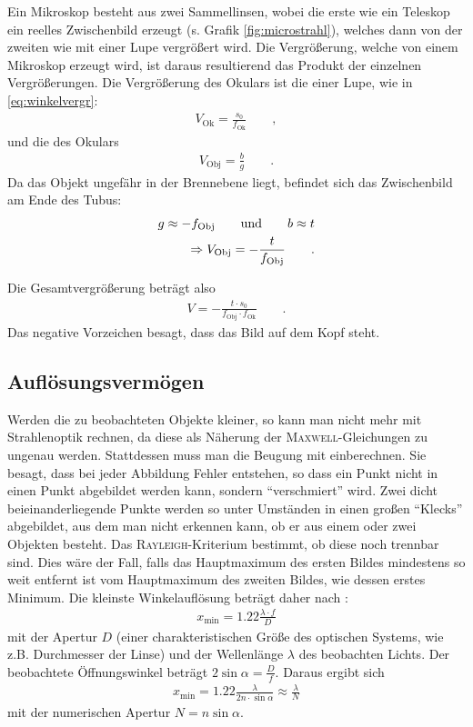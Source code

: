 \documentclass[12pt,a4paper,titlepage,headinclude,bibtotoc]{scrartcl}
\begin{document}
Ein Mikroskop besteht aus zwei Sammellinsen, wobei die erste wie ein Teleskop ein reelles Zwischenbild erzeugt (s. Grafik \ref{fig:microstrahl}), welches dann von der zweiten wie mit einer Lupe vergrößert wird.
Die Vergrößerung, welche von einem Mikroskop erzeugt wird, ist daraus resultierend das Produkt der einzelnen Vergrößerungen.
Die Vergrößerung des Okulars ist die einer Lupe, wie in \eqref{eq:winkelvergr}:
\begin{align}
V_\text{Ok}=\frac{s_0}{f_\text{Ok}}\qquad ,
\end{align}
und die des Okulars
\begin{align}
V_\text{Obj}=\frac{b}{g}\qquad .
\end{align}
Da das Objekt ungefähr in der Brennebene liegt, befindet sich das Zwischenbild am Ende des Tubus:
\begin{align}
\notag g\approx -f_\text{Obj} \qquad \text{und}\qquad b\approx t\\
\Rightarrow V_\text{Obj}=-\frac{t}{f_\text{Obj}}\qquad .
\end{align}

Die Gesamtvergrößerung beträgt also
\begin{align}
V=-\frac{t\cdot s_0}{f_\text{Obj}\cdot f_\text{Ok}}\qquad .
\end{align}
Das negative Vorzeichen besagt, dass das Bild auf dem Kopf steht.

\subsection{Auflösungsvermögen}
Werden die zu beobachteten Objekte kleiner, so kann man nicht mehr mit Strahlenoptik rechnen, da diese als Näherung der \textsc{Maxwell}-Gleichungen zu ungenau werden.
Stattdessen muss man die Beugung mit einberechnen.
Sie besagt, dass bei jeder Abbildung Fehler entstehen, so dass ein Punkt nicht in einen Punkt abgebildet werden kann, sondern "`verschmiert"' wird.
Zwei dicht beieinanderliegende Punkte werden so unter Umständen in einen großen "`Klecks"' abgebildet, aus dem man nicht erkennen kann, ob er aus einem oder zwei Objekten besteht.
Das \textsc{Rayleigh}-Kriterium bestimmt, ob diese noch trennbar sind.
Dies wäre der Fall, falls das Hauptmaximum des ersten Bildes mindestens so weit entfernt ist vom Hauptmaximum des zweiten Bildes, wie dessen erstes Minimum.
Die kleinste Winkelauflösung beträgt daher nach \cite[S. 368]{demtroeder2}:
\begin{align*}
	x_\text{min}=1.22\frac{\lambda\cdot f}{D}
\end{align*}
mit der Apertur $D$ (einer charakteristischen Größe des optischen Systems, wie z.B. Durchmesser der Linse) und der Wellenlänge $\lambda$ des beobachten Lichts.
Der beobachtete Öffnungswinkel beträgt $2\sin\alpha=\frac Df$.
Daraus ergibt sich
\begin{align}
x_\text{min}=1.22\frac{\lambda}{2n\cdot\sin\alpha}\approx\frac{\lambda}{N}
\end{align}
mit der numerischen Apertur $N=n\sin\alpha$.
\end{document}
